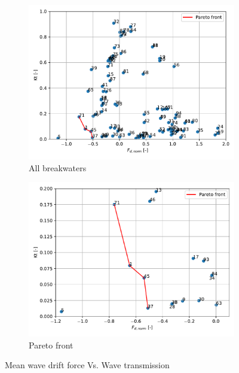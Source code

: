 \begin{figure}[h]
    \centering
    \begin{subfigure}[b]{0.49\textwidth}
        \centering
        \includegraphics[width=\linewidth]{figures/ComFLOW/Results DI1/Fd_norm_VS_Kt_normal.pdf}
        \caption[]%
        {{\small All breakwaters}}    
        \label{fig: Fd vs. Kt DI1 H3 captive normal}
    \end{subfigure}
    \hfill
    \begin{subfigure}[b]{0.49\textwidth}  
        \centering 
        \includegraphics[width=\linewidth]{figures/ComFLOW/Results DI1/Fd_norm_VS_Kt_Pareto.pdf}
        \caption[]%
        {{\small Pareto front}}    
        \label{fig: Fd vs. Kt DI1 H3 captive pareto}
    \end{subfigure}
    
    \caption{Mean wave drift force Vs. Wave transmission}
    \label{fig: Fd vs. Kt DI1 H3 captive}
\end{figure}




